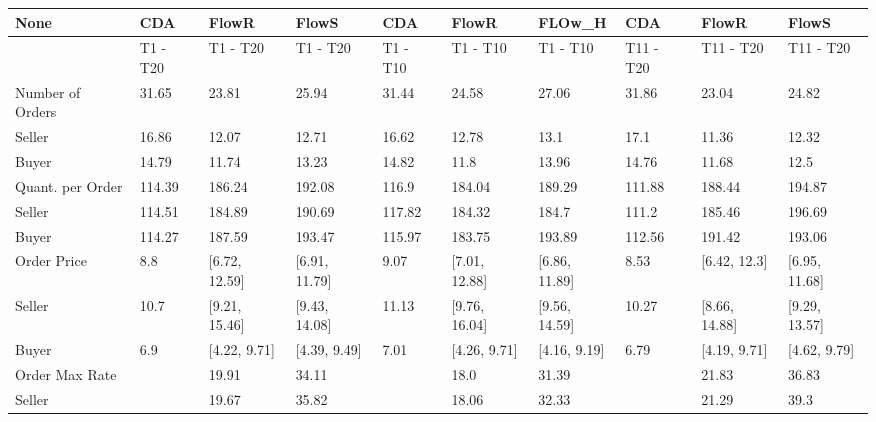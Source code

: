\begin{tabular}{llllllllll}
\hline
 None                   & CDA      & FlowR         & FlowS         & CDA      & FlowR         & FLOw\_H        & CDA       & FlowR         & FlowS         \\
\hline
                        & T1 - T20 & T1 - T20      & T1 - T20      & T1 - T10 & T1 - T10      & T1 - T10      & T11 - T20 & T11 - T20     & T11 - T20     \\
 Number of Orders       & 31.65    & 23.81         & 25.94         & 31.44    & 24.58         & 27.06         & 31.86     & 23.04         & 24.82         \\
 Seller                 & 16.86    & 12.07         & 12.71         & 16.62    & 12.78         & 13.1          & 17.1      & 11.36         & 12.32         \\
 Buyer                  & 14.79    & 11.74         & 13.23         & 14.82    & 11.8          & 13.96         & 14.76     & 11.68         & 12.5          \\
 Quant. per Order       & 114.39   & 186.24        & 192.08        & 116.9    & 184.04        & 189.29        & 111.88    & 188.44        & 194.87        \\
 Seller                 & 114.51   & 184.89        & 190.69        & 117.82   & 184.32        & 184.7         & 111.2     & 185.46        & 196.69        \\
 Buyer                  & 114.27   & 187.59        & 193.47        & 115.97   & 183.75        & 193.89        & 112.56    & 191.42        & 193.06        \\
 Order Price            & 8.8      & [6.72, 12.59] & [6.91, 11.79] & 9.07     & [7.01, 12.88] & [6.86, 11.89] & 8.53      & [6.42, 12.3]  & [6.95, 11.68] \\
 Seller                 & 10.7     & [9.21, 15.46] & [9.43, 14.08] & 11.13    & [9.76, 16.04] & [9.56, 14.59] & 10.27     & [8.66, 14.88] & [9.29, 13.57] \\
 Buyer                  & 6.9      & [4.22, 9.71]  & [4.39, 9.49]  & 7.01     & [4.26, 9.71]  & [4.16, 9.19]  & 6.79      & [4.19, 9.71]  & [4.62, 9.79]  \\
 Order Max Rate         &          & 19.91         & 34.11         &          & 18.0          & 31.39         &           & 21.83         & 36.83         \\
 Seller                 &          & 19.67         & 35.82         &          & 18.06         & 32.33         &           & 21.29         & 39.3          \\

\end{tabular}
